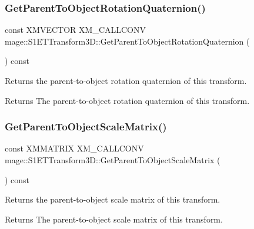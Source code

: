 \subsubsection{\texorpdfstring{Get\+Parent\+To\+Object\+Rotation\+Quaternion()}{GetParentToObjectRotationQuaternion()}}
{\footnotesize\ttfamily const X\+M\+V\+E\+C\+T\+OR X\+M\+\_\+\+C\+A\+L\+L\+C\+O\+NV mage\+::\+S1\+E\+T\+Transform3\+D\+::\+Get\+Parent\+To\+Object\+Rotation\+Quaternion (\begin{DoxyParamCaption}{ }\end{DoxyParamCaption}) const\hspace{0.3cm}{\ttfamily [noexcept]}}

Returns the parent-\/to-\/object rotation quaternion of this transform.

\begin{DoxyReturn}{Returns}
The parent-\/to-\/object rotation quaternion of this transform. 
\end{DoxyReturn}
\mbox{\label{classmage_1_1_s1_e_t_transform3_d_a9129bdf35b05eac0e949be6cd1834923}} 
\subsubsection{\texorpdfstring{Get\+Parent\+To\+Object\+Scale\+Matrix()}{GetParentToObjectScaleMatrix()}}
{\footnotesize\ttfamily const X\+M\+M\+A\+T\+R\+IX X\+M\+\_\+\+C\+A\+L\+L\+C\+O\+NV mage\+::\+S1\+E\+T\+Transform3\+D\+::\+Get\+Parent\+To\+Object\+Scale\+Matrix (\begin{DoxyParamCaption}{ }\end{DoxyParamCaption}) const\hspace{0.3cm}{\ttfamily [noexcept]}}

Returns the parent-\/to-\/object scale matrix of this transform.

\begin{DoxyReturn}{Returns}
The parent-\/to-\/object scale matrix of this transform. 
\end{DoxyReturn}
\mbox{\label{classmage_1_1_s1_e_t_transform3_d_aeb2aecdb694891ca063052874d79971b}} 
